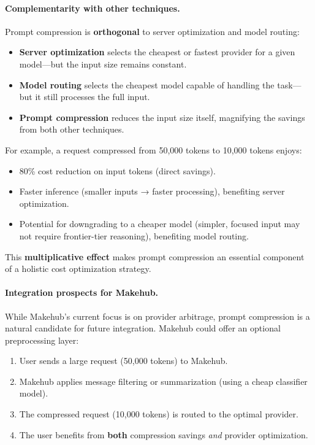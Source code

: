 \documentclass[english]{article}
\begin{document}
\paragraph{Complementarity with other techniques.}

Prompt compression is \textbf{orthogonal} to server optimization and model routing:
\begin{itemize}
    \item \textbf{Server optimization} selects the cheapest or fastest provider for a given model—but the input size remains constant.
    \item \textbf{Model routing} selects the cheapest model capable of handling the task—but it still processes the full input.
    \item \textbf{Prompt compression} reduces the input size itself, magnifying the savings from both other techniques.
\end{itemize}

For example, a request compressed from 50,000 tokens to 10,000 tokens enjoys:
\begin{itemize}
    \item 80\% cost reduction on input tokens (direct savings).
    \item Faster inference (smaller inputs → faster processing), benefiting server optimization.
    \item Potential for downgrading to a cheaper model (simpler, focused input may not require frontier-tier reasoning), benefiting model routing.
\end{itemize}

This \textbf{multiplicative effect} makes prompt compression an essential component of a holistic cost optimization strategy.

\paragraph{Integration prospects for Makehub.}

While Makehub's current focus is on provider arbitrage, prompt compression is a natural candidate for future integration. Makehub could offer an optional preprocessing layer:
\begin{enumerate}
    \item User sends a large request (50,000 tokens) to Makehub.
    \item Makehub applies message filtering or summarization (using a cheap classifier model).
    \item The compressed request (10,000 tokens) is routed to the optimal provider.
    \item The user benefits from \textbf{both} compression savings \emph{and} provider optimization.
\end{enumerate}
\end{document}
